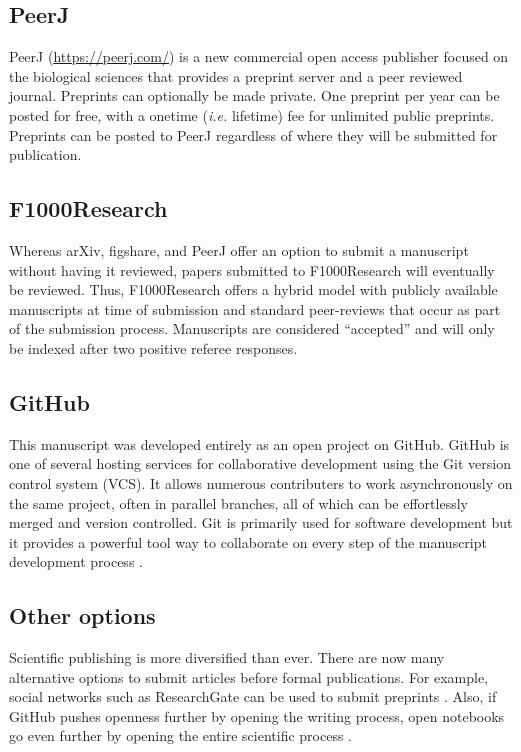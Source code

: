 \documentclass[letterpaper]{article}
\begin{document}
\subsection{PeerJ}

PeerJ (\href{https://peerj.com/}{https://peerj.com/}) is a new commercial open
access publisher focused on the biological sciences that provides a preprint
server and a peer reviewed journal. Preprints can optionally be made private.
One preprint per year can be posted for free, with a onetime (\emph{i.e.}
lifetime) fee for unlimited public preprints. Preprints can be posted to PeerJ
regardless of where they will be submitted for publication.

\subsection{F1000Research}\label{f1000r}

Whereas arXiv, figshare, and PeerJ offer an option to submit a manuscript
without having it reviewed, papers submitted to F1000Research will eventually be
reviewed. Thus, F1000Research offers a hybrid model with publicly available
manuscripts at time of submission and standard peer-reviews that occur as part
of the submission process. Manuscripts are considered ``accepted'' and will only
be indexed after two positive referee responses.

\subsection{GitHub}

This manuscript was developed entirely as an open project on GitHub. GitHub is
one of several hosting services for collaborative development using the Git
version control system (VCS). It allows numerous contributers to work
asynchronously on the same project, often in parallel branches, all of which can
be effortlessly merged and version controlled.  Git is primarily used for
software development \cite{aru12} but it provides a powerful tool way to
collaborate on every step of the manuscript development process \cite{ram13}.

\subsection{Other options}

Scientific publishing is more diversified than ever. There are now many 
alternative options to submit articles before formal publications. For 
example, social networks such as ResearchGate can be used to submit 
preprints \cite{lin12}. Also, if GitHub pushes openness further by opening 
the writing process, open notebooks go even further by opening the entire 
scientific process \cite{san11}. 
\end{document}

